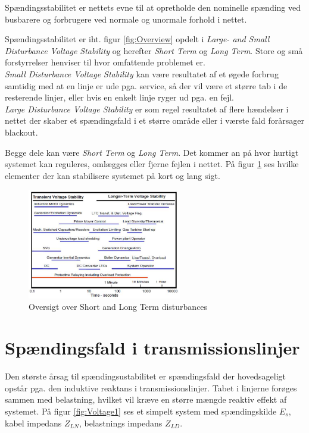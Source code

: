 
\label{Spaendingsstabilitet}

Spændingsstabilitet er nettets evne til at opretholde den nominelle spænding ved busbarere og forbrugere ved normale og unormale forhold i nettet.

Spændingsstabilitet er iht. figur \ref{fig:Overview} opdelt i \textit{Large- and Small Disturbance Voltage Stability} og herefter \textit{Short Term} og \textit{Long Term}. Store og små forstyrrelser henviser til hvor omfattende problemet er. \\
\textit{Small Disturbance Voltage Stability} kan være resultatet af et øgede forbrug samtidig med at en linje er ude pga. service, så der vil være et større tab i de resterende linjer, eller hvis en enkelt linje ryger ud pga. en fejl.\\
\textit{Large Disturbance Voltage Stability} er som regel resultatet af flere hændelser i nettet der skaber et spændingsfald i et større område eller i værste fald forårsager blackout.

Begge dele kan være \textit{Short Term} og \textit{Long Term}. Det kommer an på hvor hurtigt systemet kan reguleres, omlægges eller fjerne fejlen i nettet. På figur \ref{fig:VoltageTime} ses hvilke elementer der kan stabilisere systemet på kort og lang sigt.  

\begin{figure}[H] %
	\centering
	\includegraphics[width=0.6\textwidth]{figurer/Voltage_time}
	\caption{Oversigt over Short and Long Term disturbances}
	\label{fig:VoltageTime}
\end{figure}


\section{Spændingsfald i transmissionslinjer}
\label{SpaeningsfaldITransmissionslinjer}
Den største årsag til spændingsustabilitet er spændingsfald der hovedsageligt opstår pga. den induktive reaktans i transmissionslinjer. Tabet i linjerne forøges sammen med belastning, hvilket vil kræve en større mængde reaktiv effekt af systemet. På figur \ref{fig:Voltage1} ses et simpelt system med spændingskilde $E_{s}$, kabel impedans $Z_{LN}$, belastnings impedans $Z_{LD}$. 


